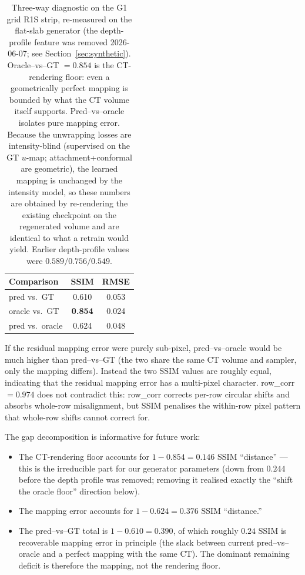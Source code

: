 \documentclass[11pt,a4paper]{article}
\begin{document}
\begin{table}[H]
\centering
\begin{tabular}{lcc}
\toprule
Comparison & SSIM & RMSE \\
\midrule
pred vs.\ GT     & 0.610 & 0.053 \\
oracle vs.\ GT   & \textbf{0.854} & 0.024 \\
pred vs.\ oracle & 0.624 & 0.048 \\
\bottomrule
\end{tabular}
\caption{Three-way diagnostic on the G1 grid R1S strip, re-measured on the flat-slab generator (the depth-profile feature was removed 2026-06-07; see Section~\ref{sec:synthetic}). Oracle--vs--GT $= 0.854$ is the CT-rendering floor: even a geometrically perfect mapping is bounded by what the CT volume itself supports. Pred--vs--oracle isolates pure mapping error. Because the unwrapping losses are intensity-blind (supervised on the GT $u$-map; attachment+conformal are geometric), the learned mapping is unchanged by the intensity model, so these numbers are obtained by re-rendering the existing checkpoint on the regenerated volume and are identical to what a retrain would yield. Earlier depth-profile values were $0.589 / 0.756 / 0.549$.}
\label{tab:phase5_oracle_diagnostic}
\end{table}

If the residual mapping error were purely sub-pixel, pred--vs--oracle would be much higher than pred--vs--GT (the two share the same CT volume and sampler, only the mapping differs). Instead the two SSIM values are roughly equal, indicating that the residual mapping error has a multi-pixel character. row\_corr $= 0.974$ does not contradict this: row\_corr corrects per-row circular shifts and absorbs whole-row misalignment, but SSIM penalises the within-row pixel pattern that whole-row shifts cannot correct for.

The gap decomposition is informative for future work:
\begin{itemize}
    \item The CT-rendering floor accounts for $1 - 0.854 = 0.146$ SSIM ``distance'' --- this is the irreducible part for our generator parameters (down from $0.244$ before the depth profile was removed; removing it realised exactly the ``shift the oracle floor'' direction below).
    \item The mapping error accounts for $1 - 0.624 = 0.376$ SSIM ``distance.''
    \item The pred--vs--GT total is $1 - 0.610 = 0.390$, of which roughly $0.24$ SSIM is recoverable mapping error in principle (the slack between current pred--vs--oracle and a perfect mapping with the same CT). The dominant remaining deficit is therefore the mapping, not the rendering floor.
\end{itemize}
\end{document}
